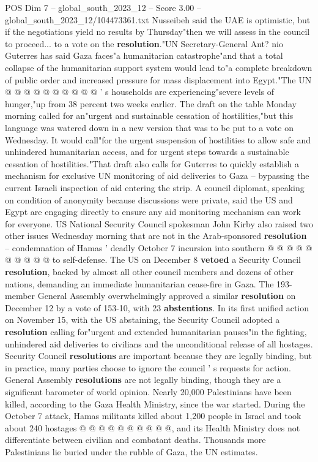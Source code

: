 \begin{textsample}{POS Dim 7 – global\_south\_2023\_12 – Score 3.00 – global\_south\_2023\_12/104473361.txt}
Nusseibeh said the UAE is optimistic, but if the negotiations yield no results by Thursday"then we will assess in the council to proceed... to a vote on the \textbf{resolution}."UN Secretary-General Ant? nio Guterres has said Gaza faces"a humanitarian catastrophe"and that a total collapse of the humanitarian support system would lead to"a complete breakdown of public order and increased pressure for mass displacement into Egypt."The UN @ @ @ @ @ @ @ @ @ @ ' s households are experiencing"severe levels of hunger,"up from 38 percent two weeks earlier.
The draft on the table Monday morning called for an"urgent and sustainable cessation of hostilities,"but this language was watered down in a new version that was to be put to a vote on Wednesday.
It would call"for the urgent suspension of hostilities to allow safe and unhindered humanitarian access, and for urgent steps towards a sustainable cessation of hostilities."That draft also calls for Guterres to quickly establish a mechanism for exclusive UN monitoring of aid deliveries to Gaza -- bypassing the current Israeli inspection of aid entering the strip.
A council diplomat, speaking on condition of anonymity because discussions were private, said the US and Egypt are engaging directly to ensure any aid monitoring mechanism can work for everyone.
US National Security Council spokesman John Kirby also raised two other issues Wednesday morning that are not in the Arab-sponsored \textbf{resolution} -- condemnation of Hamas ' deadly October 7 incursion into southern @ @ @ @ @ @ @ @ @ @ to self-defense.
The US on December 8 \textbf{vetoed} a Security Council \textbf{resolution}, backed by almost all other council members and dozens of other nations, demanding an immediate humanitarian cease-fire in Gaza.
The 193-member General Assembly overwhelmingly approved a similar \textbf{resolution} on December 12 by a vote of 153-10, with 23 \textbf{abstentions}.
In its first unified action on November 15, with the US abstaining, the Security Council adopted a \textbf{resolution} calling for"urgent and extended humanitarian pauses"in the fighting, unhindered aid deliveries to civilians and the unconditional release of all hostages.
Security Council \textbf{resolutions} are important because they are legally binding, but in practice, many parties choose to ignore the council ' s requests for action.
General Assembly \textbf{resolutions} are not legally binding, though they are a significant barometer of world opinion.
Nearly 20,000 Palestinians have been killed, according to the Gaza Health Ministry, since the war started.
During the October 7 attack, Hamas militants killed about 1,200 people in Israel and took about 240 hostages @ @ @ @ @ @ @ @ @ @, and its Health Ministry does not differentiate between civilian and combatant deaths.
Thousands more Palestinians lie buried under the rubble of Gaza, the UN estimates.

\end{textsample}
